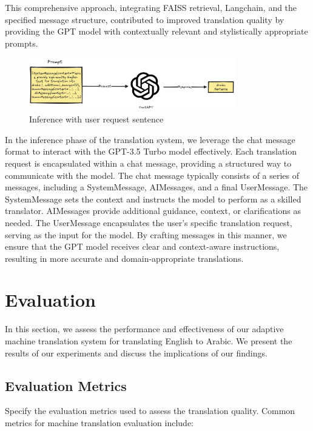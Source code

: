 \documentclass[12pt]{article}
\begin{document}
This comprehensive approach, integrating FAISS retrieval, Langchain, and the specified message structure, contributed to improved translation quality by providing the GPT model with contextually relevant and stylistically appropriate prompts.


\begin{figure}[h]
	\centering
	\includegraphics[width=0.8\textwidth]{assets/Request_GPT_with_prompt.png}
	\caption{Inference with user request sentence}
	\label{fig:inference}
\end{figure}


In the inference phase of the translation system, we leverage the chat message format to interact with the GPT-3.5 Turbo model effectively. Each translation request is encapsulated within a chat message, providing a structured way to communicate with the model. The chat message typically consists of a series of messages, including a SystemMessage, AIMessages, and a final UserMessage. The SystemMessage sets the context and instructs the model to perform as a skilled translator. AIMessages provide additional guidance, context, or clarifications as needed. The UserMessage encapsulates the user's specific translation request, serving as the input for the model. By crafting messages in this manner, we ensure that the GPT model receives clear and context-aware instructions, resulting in more accurate and domain-appropriate translations.


\section{Evaluation}

In this section, we assess the performance and effectiveness of our adaptive machine translation system for translating English to Arabic. We present the results of our experiments and discuss the implications of our findings.

\subsection{Evaluation Metrics}

Specify the evaluation metrics used to assess the translation quality. Common metrics for machine translation evaluation include:
\end{document}
